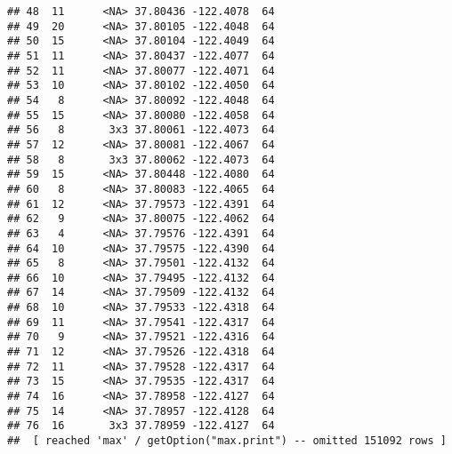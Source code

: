 \documentclass[
]{article}
\begin{document}
\begin{verbatim}
## 48  11      <NA> 37.80436 -122.4078  64
## 49  20      <NA> 37.80105 -122.4048  64
## 50  15      <NA> 37.80104 -122.4049  64
## 51  11      <NA> 37.80437 -122.4077  64
## 52  11      <NA> 37.80077 -122.4071  64
## 53  10      <NA> 37.80102 -122.4050  64
## 54   8      <NA> 37.80092 -122.4048  64
## 55  15      <NA> 37.80080 -122.4058  64
## 56   8       3x3 37.80061 -122.4073  64
## 57  12      <NA> 37.80081 -122.4067  64
## 58   8       3x3 37.80062 -122.4073  64
## 59  15      <NA> 37.80448 -122.4080  64
## 60   8      <NA> 37.80083 -122.4065  64
## 61  12      <NA> 37.79573 -122.4391  64
## 62   9      <NA> 37.80075 -122.4062  64
## 63   4      <NA> 37.79576 -122.4391  64
## 64  10      <NA> 37.79575 -122.4390  64
## 65   8      <NA> 37.79501 -122.4132  64
## 66  10      <NA> 37.79495 -122.4132  64
## 67  14      <NA> 37.79509 -122.4132  64
## 68  10      <NA> 37.79533 -122.4318  64
## 69  11      <NA> 37.79541 -122.4317  64
## 70   9      <NA> 37.79521 -122.4316  64
## 71  12      <NA> 37.79526 -122.4318  64
## 72  11      <NA> 37.79528 -122.4317  64
## 73  15      <NA> 37.79535 -122.4317  64
## 74  16      <NA> 37.78958 -122.4127  64
## 75  14      <NA> 37.78957 -122.4128  64
## 76  16       3x3 37.78959 -122.4127  64
##  [ reached 'max' / getOption("max.print") -- omitted 151092 rows ]
\end{verbatim}
\end{document}

